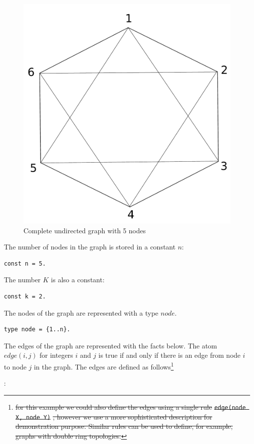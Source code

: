 \documentclass[a4paper,10pt]{article}
\providecommand{\DIFdeltex}[1]{{\protect\color{red}\sout{#1}}}                      %
\providecommand{\DIFdelbegin}{} %
\providecommand{\DIFdelend}{} %
\providecommand{\DIFdel}[1]{\texorpdfstring{\DIFdeltex{#1}}{}} %
\begin{document}
\begin{figure}[h!]
\centering
\includegraphics[scale=0.3]{drawing}
\caption{Complete undirected graph with 5 nodes}
\end{figure}\label{fig1}


\noindent


\medskip\noindent
The number of nodes in the graph is stored in a constant $n$:
\begin{verbatim}
const n = 5.
\end{verbatim}

\medskip\noindent
The number $K$ is also a constant:
\begin{verbatim}
const k = 2.
\end{verbatim} 

\medskip\noindent
The nodes of the graph are represented with a type $node$.

\begin{verbatim}
type node = {1..n}.
\end{verbatim}


\medskip\noindent
The edges of the graph are represented with the facts below. The atom $edge(i,j)$ for integers $i$ and $j$ is true if and only if there is an edge from node $i$ to node $j$ in the graph. The edges are defined as follows\DIFdelbegin \footnote{\DIFdel{for this example we could also define the edges using a single rule }\texttt{\DIFdel{edge(node X, node Y)}}%
\DIFdel{, however we use a more sophisticated description for demonstration purpose. Similar rules can be used to define, for example, graphs with double ring topologies.}}  %
\addtocounter{footnote}{-1}%
\DIFdelend :
\end{document}
